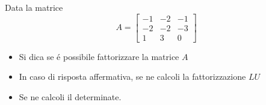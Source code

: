 Data la matrice
\bigskip
\[
A=\left[
\begin{array}{ccc}
-1 & -2 & -1 \\
-2 & -2 & -3\\
1 & 3 & 0
\end{array}\right]
\]


\begin{itemize}
\item Si dica se \'e possibile fattorizzare la matrice $A$
\item In caso di risposta affermativa, se ne calcoli la fattorizzazione $LU$

\item Se ne calcoli il determinate.
\end{itemize}
